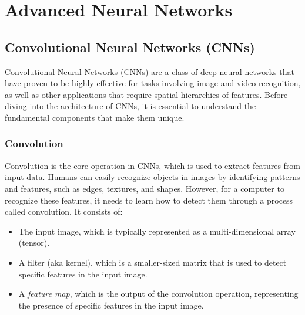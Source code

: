\chapter{Advanced Neural Networks}

\section{Convolutional Neural Networks (CNNs)}
Convolutional Neural Networks (CNNs) are a class of deep neural networks that have proven to be highly effective for tasks involving image and video recognition, as well as other applications that require spatial hierarchies of features. Before diving into the architecture of CNNs, it is essential to understand the fundamental components that make them unique.

\subsection{Convolution}


Convolution is the core operation in CNNs, which is used to extract features from input data. Humans can easily recognize objects in images by identifying patterns and features, such as edges, textures, and shapes. However, for a computer to recognize these features, it needs to learn how to detect them through a process called convolution.  It consists of:
\begin{itemize}
    \item The input image, which is typically represented as a multi-dimensional array (tensor).
    \item A filter (aka kernel), which is a smaller-sized matrix that is used to detect specific features in the input image.
    \item A \emph{feature map}, which is the output of the convolution operation, representing the presence of specific features in the input image.
\end{itemize}

